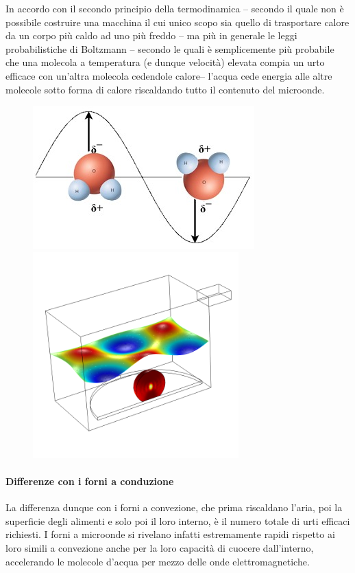 \documentclass{article}
\begin{document}
In accordo con il secondo principio della termodinamica – secondo il quale non è possibile costruire una macchina il cui unico scopo sia quello di trasportare calore da un corpo più caldo ad uno più freddo – ma più in generale le leggi probabilistiche di Boltzmann – secondo le quali è semplicemente più probabile che una molecola a temperatura (e dunque velocità) elevata compia un urto efficace con un'altra molecola cedendole calore– l'acqua cede energia alle altre molecole sotto forma di calore riscaldando tutto il contenuto del microonde.
\vspace*{-0.15in}
 \begin{figure}[h]
\centering
\includegraphics[scale=0.25]{13.png}
\includegraphics[scale=0.21]{19.png}

\label{fig: cubed graph}
\end{figure}
\vspace*{-0.3in}
\paragraph{Differenze con i forni a conduzione} La differenza dunque con i forni a convezione, che prima riscaldano l'aria, poi la superficie degli alimenti e solo poi il loro interno, è il numero totale di urti efficaci richiesti. I forni a microonde si rivelano infatti estremamente rapidi rispetto ai loro simili a convezione anche per la loro capacità di cuocere dall'interno, accelerando le molecole d'acqua per mezzo delle onde elettromagnetiche. 
\end{document}
